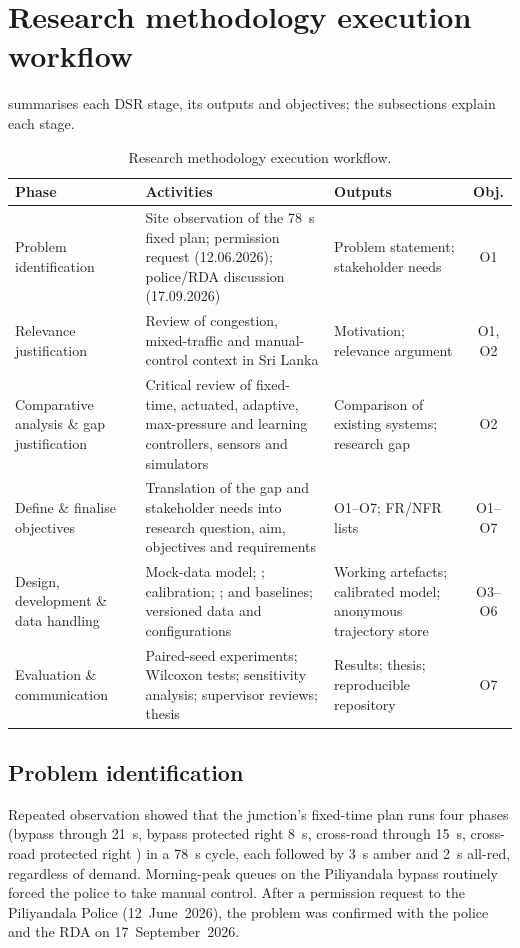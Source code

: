 \section{Research methodology execution workflow}\label{sec:method-workflow}

 summarises each DSR stage, its outputs and objectives; the subsections explain each stage.

\begin{table}[htbp]
\centering
\caption{Research methodology execution workflow.}
\label{tab:method-workflow}
\small
{}
\begin{tabularx}{\textwidth}{@{}>{\raggedright\arraybackslash}p{2.7cm}>{\raggedright\arraybackslash}X>{\raggedright\arraybackslash}p{3.6cm}c@{}}
\toprule
\textbf{Phase} & \textbf{Activities} & \textbf{Outputs} & \textbf{Obj.}\\
\midrule
Problem identification & Site observation of the 78~s fixed plan; permission request (12.06.2026); police/RDA discussion (17.09.2026) & Problem statement; stakeholder needs & O1\\
\addlinespace
Relevance justification & Review of congestion, mixed-traffic and manual-control context in Sri Lanka & Motivation; relevance argument & O1, O2\\
\addlinespace
Comparative analysis \& gap justification & Critical review of fixed-time, actuated, adaptive, max-pressure and learning controllers, sensors and simulators & Comparison of existing systems; research gap & O2\\
\addlinespace
Define \& finalise objectives & Translation of the gap and stakeholder needs into research question, aim, objectives and requirements & O1--O7; FR/NFR lists & O1--O7\\
\addlinespace
Design, development \& data handling & Mock-data model; \dtx{}; calibration; \vls{}; \prism{} and baselines; versioned data and configurations & Working artefacts; calibrated model; anonymous trajectory store & O3--O6\\
\addlinespace
Evaluation \& communication & Paired-seed experiments; Wilcoxon tests; sensitivity analysis; supervisor reviews; thesis & Results; thesis; reproducible repository & O7\\
\bottomrule
\end{tabularx}
\end{table}

\subsection{Problem identification}
Repeated observation showed that the junction's fixed-time plan runs four phases (bypass through 21~s, bypass protected right 8~s, cross-road through 15~s, cross-road protected right ) in a 78~s cycle, each followed by 3~s amber and 2~s all-red, regardless of demand. Morning-peak queues on the Piliyandala bypass routinely forced the police to take manual control. After a permission request to the Piliyandala Police (12~June~2026), the problem was confirmed with the police and the RDA on 17~September~2026.

